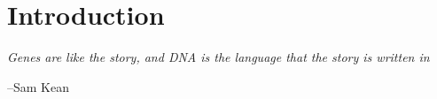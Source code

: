 \chapter{Introduction}\label{ch:intro}
\thispagestyle{empty}
\vspace*{\fill}
\epigraph{\emph{Genes are like the story, and DNA is the language that the story is written in}}
{--Sam Kean}


\clearpage
